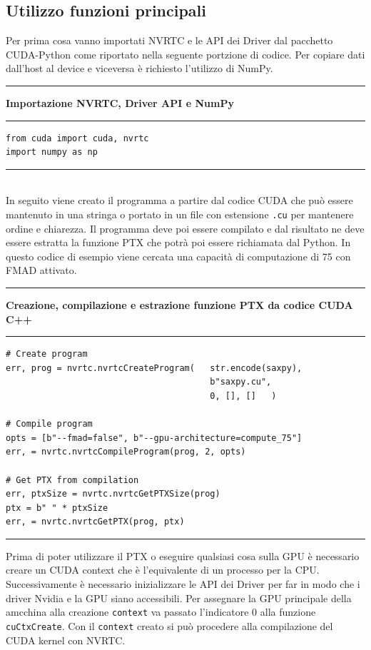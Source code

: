 \documentclass[12pt,a4paper]{report}
\begin{document}
\subsection{Utilizzo funzioni principali}
Per prima cosa vanno importati NVRTC e le API dei Driver dal pacchetto CUDA-Python come riportato nella seguente portzione di codice. Per copiare dati dall'host al device e viceversa è richiesto l'utilizzo di NumPy. \\[10pt]
\noindent\rule[0.5ex]{\linewidth}{2pt}
\small{\textbf{Importazione NVRTC, Driver API e NumPy}} \\
\noindent\rule[0.5ex]{\linewidth}{1pt}
\begin{lstlisting}
from cuda import cuda, nvrtc
import numpy as np
\end{lstlisting}
\noindent\rule[0.5ex]{\linewidth}{1pt} \\[10pt]
In seguito viene creato il programma a partire dal codice CUDA che può essere mantenuto in una stringa o portato in un file con estensione \verb|.cu| per mantenere ordine e chiarezza. Il programma deve poi essere compilato e dal risultato ne deve essere estratta la funzione PTX che potrà poi essere richiamata dal Python. In questo codice di esempio viene cercata una capacità di computazione di 75 con FMAD attivato.   \\[10pt]
\noindent\rule[0.5ex]{\linewidth}{2pt}
\small{\textbf{Creazione, compilazione e estrazione funzione PTX da codice CUDA C++}} \\
\noindent\rule[0.5ex]{\linewidth}{1pt}
\begin{lstlisting}
# Create program
err, prog = nvrtc.nvrtcCreateProgram(   str.encode(saxpy), 
                                        b"saxpy.cu", 
                                        0, [], []   )

# Compile program 
opts = [b"--fmad=false", b"--gpu-architecture=compute_75"]
err, = nvrtc.nvrtcCompileProgram(prog, 2, opts)

# Get PTX from compilation
err, ptxSize = nvrtc.nvrtcGetPTXSize(prog)
ptx = b" " * ptxSize
err, = nvrtc.nvrtcGetPTX(prog, ptx)
\end{lstlisting}
\noindent\rule[0.5ex]{\linewidth}{1pt} \newpage
Prima di poter utilizzare il PTX o eseguire qualsiasi cosa sulla GPU è necessario creare un CUDA context che è l'equivalente di un processo per la CPU. \newline
Successivamente è necessario inizializzare le API dei Driver per far in modo che i driver Nvidia e la GPU siano accessibili. Per assegnare la GPU principale della amcchina alla creazione \verb|context| va passato l'indicatore 0 alla funzione \verb|cuCtxCreate|. Con il \verb|context| creato si può procedere alla compilazione del CUDA kernel con NVRTC. \\[10pt]
\end{document}
